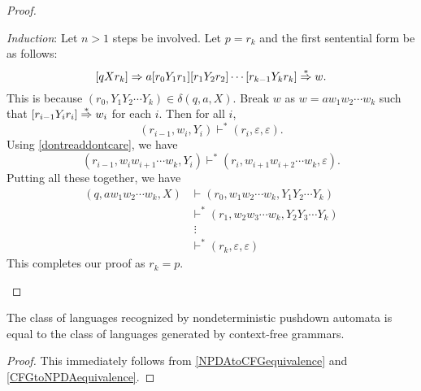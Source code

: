 \begin{proof}
\begin{itemize}
        \vspace{1mm}
        \textit{Induction}: Let $n>1$ steps be involved. Let $p=r_k$ and the first sentential form be as follows:
        $$[qXr_k]\Rightarrow a[r_0Y_1r_1][r_1Y_2r_2]\cdots[r_{k-1}Y_kr_k]\overset{*}{\Rightarrow} w.$$
        This is because $(r_0,Y_1Y_2\cdots Y_k)\in\delta(q,a,X)$. Break $w$ as $w=aw_1w_2\cdots w_k$ such that $[r_{i-1}Y_ir_i]\overset{*}{\Rightarrow} w_i$ for each $i$. Then for all $i$,
        $$(r_{i-1}, w_i, Y_i)\vdash^* (r_i,\varepsilon,\varepsilon).$$
        Using \ref{dontreaddontcare}, we have
        $$(r_{i-1}, w_iw_{i+1}\cdots w_k, Y_i)\vdash^* (r_i,w_{i+1}w_{i+2}\cdots w_k,\varepsilon).$$
        Putting all these together, we have
        \begin{align*}
            (q,aw_1w_2\cdots w_k, X)&\vdash (r_0, w_1w_2\cdots w_k, Y_1Y_2\cdots Y_k) \\
            &\vdash^* (r_1, w_2w_3\cdots w_k, Y_2Y_3\cdots Y_k) \\
            &\; \vdots \\
            &\vdash^* (r_k,\varepsilon,\varepsilon)
        \end{align*}
        This completes our proof as $r_k=p$.
    \end{itemize}
\end{proof}

\begin{theorem}
    The class of languages recognized by nondeterministic pushdown automata is equal to the class of languages generated by context-free grammars.
\end{theorem}
\begin{proof}
    This immediately follows from \ref{NPDAtoCFGequivalence} and \ref{CFGtoNPDAequivalence}.
\end{proof}
